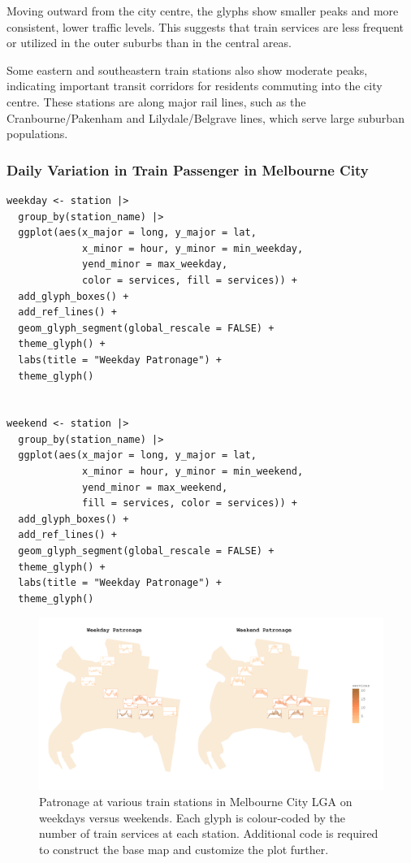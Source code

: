 Moving outward from the city centre, the glyphs show smaller peaks and more consistent, lower traffic levels. This suggests that train services are less frequent or utilized in the outer suburbs than in the central areas.

Some eastern and southeastern train stations also show moderate peaks, indicating important transit corridors for residents commuting into the city centre. These stations are along major rail lines, such as the Cranbourne/Pakenham and Lilydale/Belgrave lines, which serve large suburban populations.

\hypertarget{daily-variation-in-train-passenger-in-melbourne-city}{%
\subsubsection{Daily Variation in Train Passenger in Melbourne City}\label{daily-variation-in-train-passenger-in-melbourne-city}}

\begin{verbatim}
weekday <- station |>
  group_by(station_name) |>
  ggplot(aes(x_major = long, y_major = lat,
             x_minor = hour, y_minor = min_weekday,
             yend_minor = max_weekday,
             color = services, fill = services)) +
  add_glyph_boxes() +
  add_ref_lines() +
  geom_glyph_segment(global_rescale = FALSE) +
  theme_glyph() +
  labs(title = "Weekday Patronage") +
  theme_glyph() 


weekend <- station |>
  group_by(station_name) |>
  ggplot(aes(x_major = long, y_major = lat,
             x_minor = hour, y_minor = min_weekend,
             yend_minor = max_weekend,
             fill = services, color = services)) +
  add_glyph_boxes() +
  add_ref_lines() +
  geom_glyph_segment(global_rescale = FALSE) +
  theme_glyph() +
  labs(title = "Weekday Patronage") +
  theme_glyph() 
\end{verbatim}

\begin{figure}

{\centering \includegraphics[width=1\linewidth]{figures/weekend_weekday} 

}

\caption{Patronage at various train stations in Melbourne City LGA on weekdays versus weekends. Each glyph is colour-coded by the number of train services at each station. Additional code is required to construct the base map and customize the plot further.}\label{fig:unnamed-chunk-21}
\end{figure}

